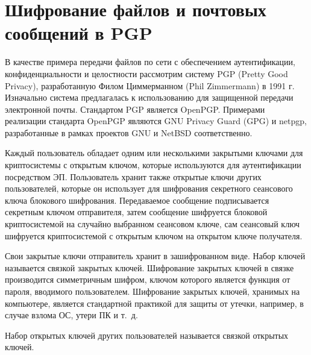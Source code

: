 \section{Шифрование файлов и почтовых сообщений в PGP}

В качестве примера передачи файлов по сети с обеспечением аутентификации, конфиденциальности и целостности рассмотрим систему PGP (Pretty Good Privacy), разработанную Филом Циммерманном (Phil Zimmermann) в 1991 г. Изначально система предлагалась к использованию для защищенной передачи электронной почты. Стандартом PGP является OpenPGP. Примерами реализации стандарта OpenPGP являются GNU Privacy Guard (GPG) и netpgp, разработанные в рамках проектов GNU и NetBSD соответственно.

Каждый пользователь обладает одним или несколькими закрытыми ключами для криптосистемы с открытым ключом, которые используются для аутентификации посредством ЭП. Пользователь хранит также открытые ключи других пользователей, которые он использует для шифрования секретного сеансового ключа блокового шифрования. Передаваемое сообщение подписывается секретным ключом отправителя, затем сообщение шифруется блоковой криптосистемой на случайно выбранном сеансовом ключе, сам сеансовый ключ шифруется криптосистемой с открытым ключом на открытом ключе получателя.

Свои закрытые ключи отправитель хранит в зашифрованном виде. Набор ключей называется связкой закрытых ключей. Шифрование закрытых ключей в связке производится симметричным шифром, ключом которого является функция от пароля, вводимого пользователем. Шифрование закрытых ключей, хранимых на компьютере, является стандартной практикой для защиты от утечки, например, в случае взлома ОС, утери ПК и т.~д.

Набор открытых ключей других пользователей называется связкой открытых ключей.

